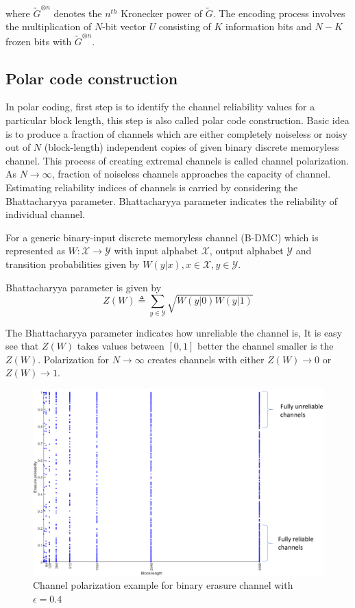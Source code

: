 where $\utilde{G}^{\otimes n}$ denotes the $n^{th}$ Kronecker power of $\utilde{G}$. The encoding process involves the multiplication of $N$-bit vector $U$ consisting of $K$ information bits and $N-K$ frozen bits with $\utilde{G}^{\otimes n}$.

\subsection{Polar code construction} \label{CodeConstruction}
In polar coding, first step is to identify the channel reliability values for a particular block length, this step is also called polar code construction. Basic idea  is to produce a fraction of channels which are either completely noiseless or noisy out of $N$ (block-length) independent copies of given binary discrete memoryless channel. This process of creating extremal channels is called channel polarization. As $N\to\infty$, fraction of noiseless channels approaches the capacity of channel. Estimating reliability indices of channels is carried by considering the Bhattacharyya parameter\cite{Arikan}. Bhattacharyya parameter indicates the reliability of individual channel.
 
For a generic binary-input discrete memoryless channel (B-DMC) which is represented as $W \colon \mathcal{X} \to \mathcal{Y}$ with input alphabet $\mathcal{X}$, output alphabet $\mathcal{Y}$ and transition probabilities given by $W(y|x),x \in \mathcal{X}, y \in \mathcal{Y}$.

Bhattacharyya parameter is given by 
\begin{equation}
	Z(W) \triangleq \sum_{y \in \mathcal{Y}} \sqrt{W(y|0)W(y|1)}
\end{equation}

The Bhattacharyya parameter indicates how unreliable the channel is, It is easy see that $Z(W)$ takes values between $[0,1]$ better the channel smaller is the $Z(W)$. Polarization for $N \to \infty$ creates channels with either $Z(W) \to 0$ or $Z(W) \to 1$.

\begin{figure}[h]
	\centering
	\includegraphics[width=1\textwidth]{./figures/channelPolarization1.pdf}
	\caption{Channel polarization example for binary erasure channel with $\epsilon = 0.4$}
	\label{fig:channelPolarizationPlot}
\end{figure}

